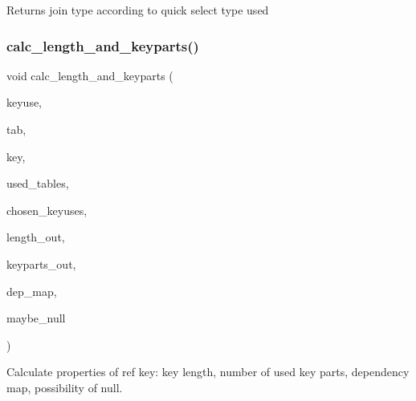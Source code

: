 \begin{DoxyReturn}{Returns}
join type according to quick select type used 
\end{DoxyReturn}
\mbox{\label{group__Query__Optimizer_ga5f8a3668a5d5771061e14f5d87c30794}} 
\subsubsection{\texorpdfstring{calc\+\_\+length\+\_\+and\+\_\+keyparts()}{calc\_length\_and\_keyparts()}}
{\footnotesize\ttfamily void calc\+\_\+length\+\_\+and\+\_\+keyparts (\begin{DoxyParamCaption}\item[{\mbox{\hyperlink{classKey__use}{Key\+\_\+use}} $\ast$}]{keyuse,  }\item[{\mbox{\hyperlink{classJOIN__TAB}{J\+O\+I\+N\+\_\+\+T\+AB}} $\ast$}]{tab,  }\item[{const uint}]{key,  }\item[{table\+\_\+map}]{used\+\_\+tables,  }\item[{\mbox{\hyperlink{classKey__use}{Key\+\_\+use}} $\ast$$\ast$}]{chosen\+\_\+keyuses,  }\item[{uint $\ast$}]{length\+\_\+out,  }\item[{uint $\ast$}]{keyparts\+\_\+out,  }\item[{table\+\_\+map $\ast$}]{dep\+\_\+map,  }\item[{bool $\ast$}]{maybe\+\_\+null }\end{DoxyParamCaption})}

Calculate properties of ref key\+: key length, number of used key parts, dependency map, possibility of null.


